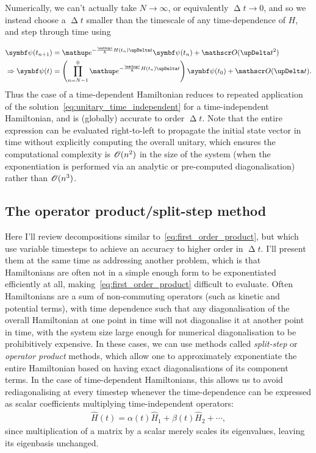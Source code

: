 Numerically, we can't actually take $N\rightarrow\infty$, or equivalently $\upDelta t \rightarrow 0$, and so we instead choose a $\upDelta t$ smaller than the timescale of any time-dependence of $H$, and step through time using

\begin{align}\label{eq:first_order_product}
\vec \psi(t_{n+1}) &=
\ee^{-\frac \ii \hbar  H(t_n)\upDelta t}\vec \psi(t_n) + \Ord{\upDelta t^2}\\
\Rightarrow \vec \psi(t) &=
\left(\prod_{n=N-1}^0 \ee^{-\frac \ii \hbar  H(t_n)\upDelta t} \right)\vec \psi(t_0) + \Ord{\upDelta t}.
\end{align}
Thus the case of a time-dependent Hamiltonian reduces to repeated application of the solution~\eqref{eq:unitary_time_independent} for a time-independent Hamiltonian, and is (globally) accurate to order $\upDelta t$. Note that the entire expression can be evaluated right-to-left to propagate the initial state vector in time without explicitly computing the overall unitary, which ensures the computational complexity is $\mathscr{O}(n^2)$ in the size of the system (when the exponentiation is performed via an analytic or pre-computed diagonalisation) rather than $\mathscr{O}(n^3)$.

\subsection{The operator product/split-step method}\label{sec:split-step}

Here I'll review decompositions similar to~\eqref{eq:first_order_product}, but which use variable timesteps to achieve an accuracy to higher order in $\upDelta t$. I'll present them at the same time as addressing another problem, which is that Hamiltonians are often not in a simple enough form to be exponentiated efficiently at all, making~\eqref{eq:first_order_product} difficult to evaluate. Often Hamiltonians are a sum of non-commuting operators (such as kinetic and potential terms), with time dependence such that any diagonalisation of the overall Hamiltonian at one point in time will not diagonalise it at another point in time, with the system size large enough for numerical diagonalisation to be prohibitively expensive. In these cases, we can use methods called \emph{split-step} or \emph{operator product} methods, which allow one to approximately exponentiate the entire Hamiltonian based on having exact diagonalisations of its component terms. In the case of time-dependent Hamiltonians, this allows us to avoid rediagonalising at every timestep whenever the time-dependence can be expressed as scalar coefficients multiplying time-independent operators:
\begin{align}
\hat H(t) = \alpha(t)\hat H_1 + \beta(t)\hat H_2 + \cdots,
\end{align}
since multiplication of a matrix by a scalar merely scales its eigenvalues, leaving its eigenbasis unchanged.

